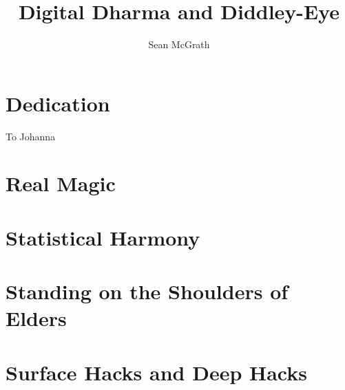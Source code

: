 \documentclass[12pt]{book}
\begin{document}
\graphicspath{ {images/} }

\title{
	{Digital Dharma and Diddley-Eye}
}
\author{Sean McGrath}

\maketitle

\chapter*{Dedication}
To Johanna

\tableofcontents

\chapter{Real Magic}


\chapter{Statistical Harmony}


\chapter{Standing on the Shoulders of Elders}


\chapter{Surface Hacks and Deep Hacks}

\end{document}
